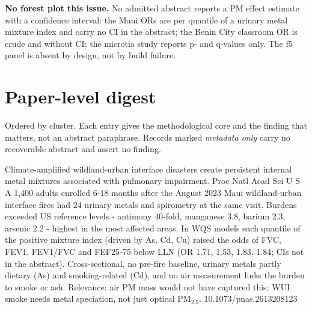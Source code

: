 \documentclass[10pt]{article}
\begin{document}
\vspace{2mm}

{\fontsize{7.4}{9}\selectfont\color{Slate}\textbf{No forest plot this issue.} No admitted
abstract reports a PM effect estimate with a confidence interval: the Maui ORs are per quantile of a
urinary metal mixture index and carry no CI in the abstract; the Benin City classroom OR is crude and
without CI; the microtia study reports p- and q-values only. The f5 panel is absent by design, not by
build failure.\par}

\vspace{4mm}

\section*{\sffamily\bfseries\color{Deep}Paper-level digest}
\vspace{-1.5mm}{\color{Amber}\rule{\linewidth}{1.1pt}}\vspace{2.5mm}

{\fontsize{7.4}{9}\selectfont\color{Slate}Ordered by cluster. Each entry gives the
methodological core and the finding that matters, not an abstract paraphrase. Records
marked \textit{metadata only} carry no recoverable abstract and assert no finding.\par}

\par{}\baselineskip{}\baselineskip
{}

{Climate-amplified wildland-urban interface disasters create persistent internal metal mixtures associated with pulmonary impairment.}
{Proc Natl Acad Sci U S A}
{1,400 adults enrolled 6-18 months after the August 2023 Maui wildland-urban interface fires had 24 urinary metals and spirometry at the same visit. Burdens exceeded US reference levels - antimony 40-fold, manganese 3.8, barium 2.3, arsenic 2.2 - highest in the most affected areas. In WQS models each quantile of the positive mixture index (driven by As, Cd, Cu) raised the odds of FVC, FEV1, FEV1/FVC and FEF25-75 below LLN (OR 1.71, 1.53, 1.83, 1.84; CIs not in the abstract). Cross-sectional, no pre-fire baseline, urinary metals partly dietary (As) and smoking-related (Cd), and no air measurement links the burden to smoke or ash. Relevance: air PM mass would not have captured this; WUI smoke needs metal speciation, not just optical PM$_{2.5}$.}
{10.1073/pnas.2613208123}
\end{document}
